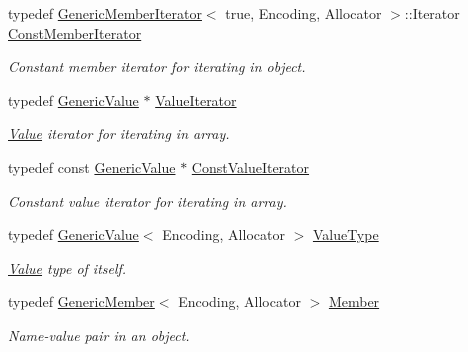\begin{DoxyCompactItemize}
\mbox{\label{classGenericValue_aac08c3e660a9036d3dcb8b10ff6c61f4}} 
typedef \hyperlink{classGenericMemberIterator}{Generic\+Member\+Iterator}$<$ true, Encoding, Allocator $>$\+::Iterator \hyperlink{classGenericValue_aac08c3e660a9036d3dcb8b10ff6c61f4}{Const\+Member\+Iterator}
\begin{DoxyCompactList}\small\item\em Constant member iterator for iterating in object. \end{DoxyCompactList}\item 
\mbox{\label{classGenericValue_aee30721a49688ba0f865f5d581eb6be9}} 
typedef \hyperlink{classGenericValue}{Generic\+Value} $\ast$ \hyperlink{classGenericValue_aee30721a49688ba0f865f5d581eb6be9}{Value\+Iterator}
\begin{DoxyCompactList}\small\item\em \hyperlink{classValue}{Value} iterator for iterating in array. \end{DoxyCompactList}\item 
\mbox{\label{classGenericValue_a49010c6d6886f96ff0b0c51bccc7f6ea}} 
typedef const \hyperlink{classGenericValue}{Generic\+Value} $\ast$ \hyperlink{classGenericValue_a49010c6d6886f96ff0b0c51bccc7f6ea}{Const\+Value\+Iterator}
\begin{DoxyCompactList}\small\item\em Constant value iterator for iterating in array. \end{DoxyCompactList}\item 
\mbox{\label{classGenericValue_a43a39bb4fca9b9d3de3da6ac353d25ce}} 
typedef \hyperlink{classGenericValue}{Generic\+Value}$<$ Encoding, Allocator $>$ \hyperlink{classGenericValue_a43a39bb4fca9b9d3de3da6ac353d25ce}{Value\+Type}
\begin{DoxyCompactList}\small\item\em \hyperlink{classValue}{Value} type of itself. \end{DoxyCompactList}\item 
\mbox{\label{classGenericValue_a7ccf27c44058b4c11c3efc6473afb886}} 
typedef \hyperlink{structGenericMember}{Generic\+Member}$<$ Encoding, Allocator $>$ \hyperlink{classGenericValue_a7ccf27c44058b4c11c3efc6473afb886}{Member}
\begin{DoxyCompactList}\small\item\em Name-\/value pair in an object. \end{DoxyCompactList}\item 

\end{DoxyCompactItemize}
